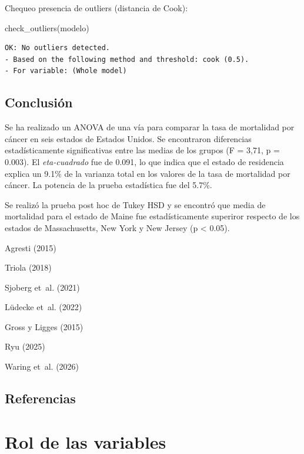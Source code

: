 \documentclass[
  spanish,
  a4paper,
]{scrbook}
\newenvironment{Shaded}{\begin{snugshade}}{\end{snugshade}}
\newcommand{\FunctionTok}[1]{\textcolor[rgb]{0.28,0.35,0.67}{#1}}
\newcommand{\NormalTok}[1]{\textcolor[rgb]{0.00,0.23,0.31}{#1}}
\begin{document}
Chequeo presencia de outliers (distancia de Cook):

\begin{Shaded}
\begin{Highlighting}[]
\FunctionTok{check\_outliers}\NormalTok{(modelo)}
\end{Highlighting}
\end{Shaded}

\begin{verbatim}
OK: No outliers detected.
- Based on the following method and threshold: cook (0.5).
- For variable: (Whole model)
\end{verbatim}

\section{Conclusión}\label{conclusiuxf3n}

Se ha realizado un ANOVA de una vía para comparar la tasa de mortalidad
por cáncer en seis estados de Estados Unidos. Se encontraron diferencias
estadísticamente significativas entre las medias de los grupos (F =
3,71, p = 0.003). El \emph{eta-cuadrado} fue de 0.091, lo que indica que
el estado de residencia explica un 9.1\% de la varianza total en los
valores de la tasa de mortalidad por cáncer. La potencia de la prueba
estadística fue del 5.7\%.

Se realizó la prueba post hoc de Tukey HSD y se encontró que media de
mortalidad para el estado de Maine fue estadísticamente superiror
respecto de los estados de Massachusetts, New York y New Jersey (p
\textless{} 0.05).

Agresti (2015)

Triola (2018)

Sjoberg et~al. (2021)

Lüdecke et~al. (2022)

Gross y Ligges (2015)

Ryu (2025)

Waring et~al. (2026)

\section*{Referencias}\label{referencias-15}


\chapter{Rol de las variables}\label{rol-de-las-variables}
\end{document}
